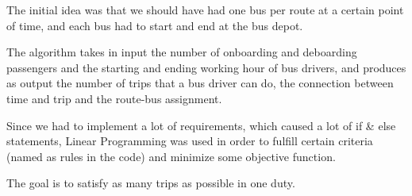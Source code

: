 The initial idea was that we should have had one bus per route at a certain point of time, and each bus had to start and end at the bus depot.

The algorithm takes in input the number of onboarding and deboarding passengers and the starting and ending working hour of bus drivers, and produces as output the number of trips that a bus driver can do, the connection between time and trip and the route-bus assignment. 

Since we had to implement a lot of requirements, which caused a lot of if \& else statements, Linear Programming was used in order to fulfill certain criteria (named as rules in the code) and minimize some objective function.

The goal is to satisfy as many trips as possible in one duty.